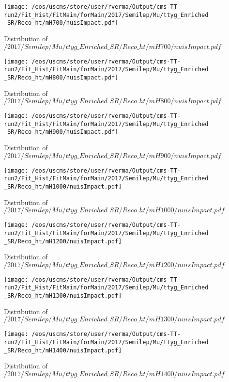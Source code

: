 \begin{figure}
\centering
\texttt{[image: /eos/uscms/store/user/rverma/Output/cms-TT-run2/Fit\_Hist/FitMain/forMain/2017/Semilep/Mu/ttyg\_Enriched\_SR/Reco\_ht/mH700/nuisImpact.pdf]}
\caption{Distribution of $/2017/Semilep/Mu/ttyg\_Enriched\_SR/Reco\_ht/mH700/nuisImpact.pdf$}
\end{figure}

\begin{figure}
\centering
\texttt{[image: /eos/uscms/store/user/rverma/Output/cms-TT-run2/Fit\_Hist/FitMain/forMain/2017/Semilep/Mu/ttyg\_Enriched\_SR/Reco\_ht/mH800/nuisImpact.pdf]}
\caption{Distribution of $/2017/Semilep/Mu/ttyg\_Enriched\_SR/Reco\_ht/mH800/nuisImpact.pdf$}
\end{figure}

\begin{figure}
\centering
\texttt{[image: /eos/uscms/store/user/rverma/Output/cms-TT-run2/Fit\_Hist/FitMain/forMain/2017/Semilep/Mu/ttyg\_Enriched\_SR/Reco\_ht/mH900/nuisImpact.pdf]}
\caption{Distribution of $/2017/Semilep/Mu/ttyg\_Enriched\_SR/Reco\_ht/mH900/nuisImpact.pdf$}
\end{figure}

\begin{figure}
\centering
\texttt{[image: /eos/uscms/store/user/rverma/Output/cms-TT-run2/Fit\_Hist/FitMain/forMain/2017/Semilep/Mu/ttyg\_Enriched\_SR/Reco\_ht/mH1000/nuisImpact.pdf]}
\caption{Distribution of $/2017/Semilep/Mu/ttyg\_Enriched\_SR/Reco\_ht/mH1000/nuisImpact.pdf$}
\end{figure}

\begin{figure}
\centering
\texttt{[image: /eos/uscms/store/user/rverma/Output/cms-TT-run2/Fit\_Hist/FitMain/forMain/2017/Semilep/Mu/ttyg\_Enriched\_SR/Reco\_ht/mH1200/nuisImpact.pdf]}
\caption{Distribution of $/2017/Semilep/Mu/ttyg\_Enriched\_SR/Reco\_ht/mH1200/nuisImpact.pdf$}
\end{figure}

\begin{figure}
\centering
\texttt{[image: /eos/uscms/store/user/rverma/Output/cms-TT-run2/Fit\_Hist/FitMain/forMain/2017/Semilep/Mu/ttyg\_Enriched\_SR/Reco\_ht/mH1300/nuisImpact.pdf]}
\caption{Distribution of $/2017/Semilep/Mu/ttyg\_Enriched\_SR/Reco\_ht/mH1300/nuisImpact.pdf$}
\end{figure}

\begin{figure}
\centering
\texttt{[image: /eos/uscms/store/user/rverma/Output/cms-TT-run2/Fit\_Hist/FitMain/forMain/2017/Semilep/Mu/ttyg\_Enriched\_SR/Reco\_ht/mH1400/nuisImpact.pdf]}
\caption{Distribution of $/2017/Semilep/Mu/ttyg\_Enriched\_SR/Reco\_ht/mH1400/nuisImpact.pdf$}
\end{figure}

